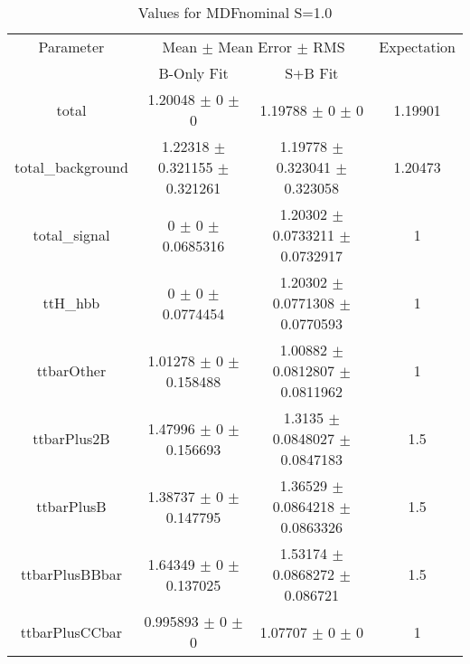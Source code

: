 \begin{table}
\centering
\caption{Values for MDFnominal S=1.0}
\begin{tabular}{cccc}
\toprule
Parameter & \multicolumn{2}{c}{Mean $\pm$ Mean Error $\pm$ RMS} & Expectation\\
 & B-Only Fit & S+B Fit & \\
\midrule
total & \num{1.20048} $\pm$ \num{0} $\pm$ \num{0} & \num{1.19788} $\pm$ \num{0} $\pm$ \num{0} & \num{1.19901}\\
total\_background & \num{1.22318} $\pm$ \num{0.321155} $\pm$ \num{0.321261} & \num{1.19778} $\pm$ \num{0.323041} $\pm$ \num{0.323058} & \num{1.20473}\\
total\_signal & \num{0} $\pm$ \num{0} $\pm$ \num{0.0685316} & \num{1.20302} $\pm$ \num{0.0733211} $\pm$ \num{0.0732917} & \num{1}\\
ttH\_hbb & \num{0} $\pm$ \num{0} $\pm$ \num{0.0774454} & \num{1.20302} $\pm$ \num{0.0771308} $\pm$ \num{0.0770593} & \num{1}\\
ttbarOther & \num{1.01278} $\pm$ \num{0} $\pm$ \num{0.158488} & \num{1.00882} $\pm$ \num{0.0812807} $\pm$ \num{0.0811962} & \num{1}\\
ttbarPlus2B & \num{1.47996} $\pm$ \num{0} $\pm$ \num{0.156693} & \num{1.3135} $\pm$ \num{0.0848027} $\pm$ \num{0.0847183} & \num{1.5}\\
ttbarPlusB & \num{1.38737} $\pm$ \num{0} $\pm$ \num{0.147795} & \num{1.36529} $\pm$ \num{0.0864218} $\pm$ \num{0.0863326} & \num{1.5}\\
ttbarPlusBBbar & \num{1.64349} $\pm$ \num{0} $\pm$ \num{0.137025} & \num{1.53174} $\pm$ \num{0.0868272} $\pm$ \num{0.086721} & \num{1.5}\\
ttbarPlusCCbar & \num{0.995893} $\pm$ \num{0} $\pm$ \num{0} & \num{1.07707} $\pm$ \num{0} $\pm$ \num{0} & \num{1}\\
\bottomrule
\end{tabular}
\end{table}